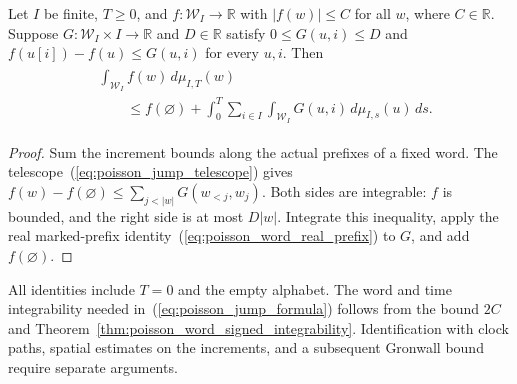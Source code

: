 \begin{theorem}
\label{thm:poisson_word_jump_upper}
\leanok
{}
Let $I$ be finite, $T\geq0$, and $f:\mathcal W_I\to\mathbb R$ with
$|f(w)|\leq C$ for all $w$, where $C\in\mathbb R$.
Suppose $G:\mathcal W_I\times I\to\mathbb R$ and $D\in\mathbb R$
satisfy $0\leq G(u,i)\leq D$ and $f(u[i])-f(u)\leq G(u,i)$
for every $u,i$.  Then
\begin{align}
 \begin{aligned}
 &\int_{\mathcal W_I}f(w)\,d\mu_{I,T}(w)
 \\
 &\qquad\leq f(\varnothing)+\int_0^T\sum_{i\in I}\int_{\mathcal W_I}
 G(u,i)\,d\mu_{I,s}(u)\,ds.
 \end{aligned}
 \label{eq:poisson_jump_upper}
\end{align}
\end{theorem}
\begin{proof}
\leanok
{}
Sum the increment bounds along the actual prefixes of a fixed word.
The telescope~(\ref{eq:poisson_jump_telescope}) gives
$f(w)-f(\varnothing)\leq\sum_{j<|w|}G(w_{<j},w_j)$.
Both sides are integrable: $f$ is bounded, and the right side is at most
$D|w|$.  Integrate this inequality, apply the real marked-prefix
identity~(\ref{eq:poisson_word_real_prefix}) to $G$, and add
$f(\varnothing)$.
\end{proof}

All identities include $T=0$ and the empty alphabet.  The word and time
integrability needed in~(\ref{eq:poisson_jump_formula}) follows from
the bound $2C$ and Theorem~\ref{thm:poisson_word_signed_integrability}.
Identification with clock paths, spatial estimates on the increments,
and a subsequent Gronwall bound require separate arguments.
